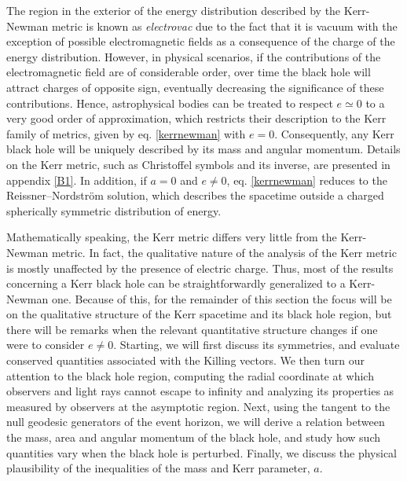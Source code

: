 \documentclass[
12pt,		%
openright,	%
twoside,  %
a4paper,			%
chapter=TITLE,		%
english,			%
french,				%
spanish,			%
brazil				%
]{USPSC-classe/USPSC}
\begin{document}
The region in the exterior of the energy distribution described by the Kerr-Newman metric is known as \textit{electrovac} due to the fact that it is vacuum with the exception of possible electromagnetic fields as a consequence of the charge of the energy distribution. However, in physical scenarios, if the contributions of the electromagnetic field are of considerable order, over time the black hole will attract charges of opposite sign, eventually decreasing the significance of these contributions. Hence, astrophysical bodies can be treated to respect $e\simeq 0$ to a very good order of approximation, which restricts their description to the Kerr family of metrics, given by eq. \ref{kerrnewman} with $e=0$. Consequently, any Kerr black hole will be uniquely described by its mass and angular momentum. Details on the Kerr metric, such as Christoffel symbols and its inverse, are presented in appendix \ref{B1}. In addition, if $a=0$ and $e\neq0$, eq. \ref{kerrnewman} reduces to the Reissner–Nordström solution, which describes the spacetime outside a charged spherically symmetric distribution of energy. 

Mathematically speaking, the Kerr metric differs very little from the Kerr-Newman metric. In fact, the qualitative nature of the analysis of the Kerr metric is mostly unaffected by the presence of electric charge. Thus, most of the results concerning a Kerr black hole can be straightforwardly generalized to a Kerr-Newman one. Because of this, for the remainder of this section the focus will be on the qualitative structure of the Kerr spacetime and its black hole region, but there will be remarks when the relevant quantitative structure changes if one were to consider $e\neq0$. Starting, we will first discuss its symmetries, and evaluate conserved quantities associated with the Killing vectors. We then turn our attention to the black hole region, computing the radial coordinate at which observers and light rays cannot escape to infinity and analyzing its properties as measured by observers at the asymptotic region. Next, using the tangent to the null geodesic generators of the event horizon, we will derive a relation between the mass, area and angular momentum of the black hole, and study how such quantities vary when the black hole is perturbed. Finally, we discuss the physical plausibility of the inequalities of the mass and Kerr parameter, $a$. 
\end{document}
